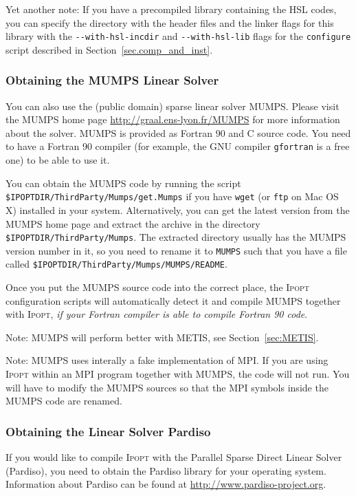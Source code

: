 \documentclass[10pt]{article}
\newcommand{\Ipopt}{\textsc{Ipopt}\xspace}
\begin{document}
Yet another note: If you have a precompiled library containing the
HSL codes, you can specify the directory with the header files and
the linker flags for this library with the \verb|--with-hsl-incdir| and
\verb|--with-hsl-lib| flags for the {\tt configure} script described in
Section~\ref{sec.comp_and_inst}.

\subsubsection{Obtaining the MUMPS Linear Solver}\label{sec:MUMPS}

You can also use the (public domain) sparse linear solver MUMPS.
Please visit the MUMPS home page \url{http://graal.ens-lyon.fr/MUMPS}
for more information about the solver. MUMPS is provided as Fortran 90
and C source code.  You need to have a Fortran 90 compiler (for
example, the GNU compiler {\tt gfortran} is a free one) to be able to
use it.

You can obtain the MUMPS code by running the script
{\tt \$IPOPTDIR/ThirdParty/Mumps/get.Mumps} if you have {\tt wget} 
(or {\tt ftp} on Mac OS X) installed in your system. 
Alternatively, you can get the latest version
from the MUMPS home page and extract the archive in the
directory {\tt \$IPOPTDIR/ThirdParty/Mumps}.  The extracted
directory usually has the MUMPS version number in it, so you need to
rename it to {\tt MUMPS} such that you have a file called
{\tt \$IPOPTDIR/ThirdParty/Mumps/MUMPS/README}.

Once you put the MUMPS source code into the correct place, the \Ipopt
configuration scripts will automatically detect it and compile MUMPS
together with \Ipopt, \emph{if your Fortran compiler is able to compile
Fortran 90 code}.

Note: MUMPS will perform better with METIS, see
Section~\ref{sec:METIS}.

Note: MUMPS uses interally a fake implementation of MPI.  If you are
using \Ipopt within an MPI program together with MUMPS, the code will
not run.  You will have to modify the MUMPS sources so that the MPI
symbols inside the MUMPS code are renamed.

\subsubsection{Obtaining the Linear Solver Pardiso}\label{sec:Pardiso}

If you would like to compile \Ipopt with the Parallel Sparse Direct
Linear Solver (Pardiso), you need to obtain the Pardiso library for
your operating system.  Information about Pardiso can be found at
\url{http://www.pardiso-project.org}.
\end{document}
